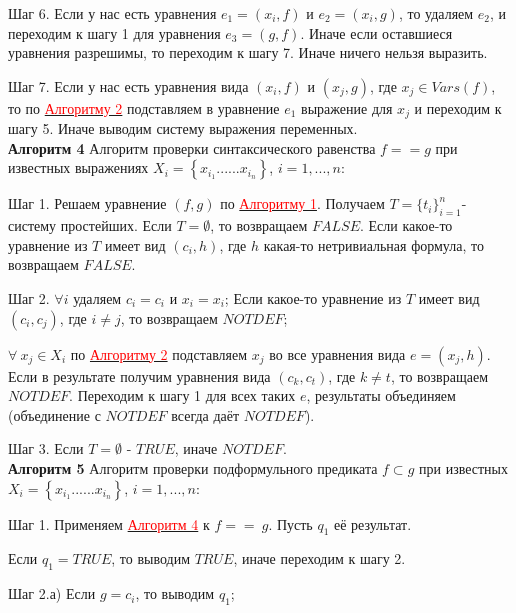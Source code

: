 \documentclass[12pt]{article}
\begin{document}
     Шаг 6. Если у нас есть уравнения $e_{1} =(x_{i},f)$ и $e_{2} =(x_{i},g)$, то удаляем $e_{2}$, и переходим к  шагу 1 для  уравнения   $e_{3} =(g,f)$. Иначе если оставшиеся уравнения разрешимы, то переходим к шагу 7. Иначе ничего нельзя выразить.
     
     Шаг 7. Если у нас есть уравнения вида $(x_{i},f)$ и $(x_{j},g)$, где $x_{j} \in Vars(f)$, то по \hyperlink{a2}{ \textcolor{red}{Алгоритму 2}} подставляем в уравнение $e_{1}$ выражение для $x_{j}$ и переходим к шагу 5. Иначе выводим систему выражения переменных. 
     \\
     
     \hypertarget{a4}{{\bf Алгоритм 4}} Алгоритм проверки синтаксического равенства $f == g $ при известных выражениях $ X_{i} = \left\lbrace x_{i_{1}} ......x_{i_{n}}\right\rbrace $, $i = 1,...,n$: 
       
     Шаг 1. Решаем уравнение $(f,g)$ по \hyperlink{a1}{ \textcolor{red} {Алгоритму 1}}.  Получаем  $T = \lbrace  t_{i}  \rbrace_{i=1}^{n} $- систему простейших. Если  $ T= {\emptyset}$, то возвращаем $FALSE$. Если какое-то уравнение из $T$ имеет вид $(c_{i}, h)$, где $h$ какая-то нетривиальная формула, то возвращаем $FALSE$.
     
     Шаг 2. 
     $\forall i$ удаляем $c_{i} = c_{i}$ и $x_{i} = x_{i}$;
     Если какое-то уравнение из $T$ имеет вид $(c_{i}, c_{j})$, где $i \neq j$, то возвращаем $NOTDEF$;
    
      $ \forall \: x_{j} \in X_{i}$  по \hyperlink{a2}{ \textcolor{red}{Алгоритму 2}} подставляем $x_{j}$ во все уравнения вида $e = (x_{j}, h)$. Если в результате получим уравнения вида $(c_{k}, c_{t})$, где $k \neq t$, то возвращаем $NOTDEF$. Переходим к шагу 1 для всех таких $e$, результаты объединяем (объединение с $NOTDEF$ всегда даёт $NOTDEF$).
     
     Шаг 3. Если $ T= {\emptyset}$ - $TRUE$, иначе $NOTDEF$.
     \\
     
      \hypertarget{a5}{{\bf Алгоритм 5}} Алгоритм проверки подформульного предиката $f \subset g $ при известных $ X_{i} = \left\lbrace x_{i_{1}} ......x_{i_{n}}\right\rbrace $, $i = 1,...,n$:
      
          Шаг 1. Применяем \hyperlink{a3}{ \textcolor{red}{Алгоритм 4}}  к $f == \:g$. Пусть $q_{1}$ её результат.
      
      Если $q_{1} = TRUE$, то выводим $TRUE$, иначе переходим к шагу 2.
      
      Шаг 2.а) Если  $ g = c_{i}$, то выводим $q_{1}$;
      
\end{document}
